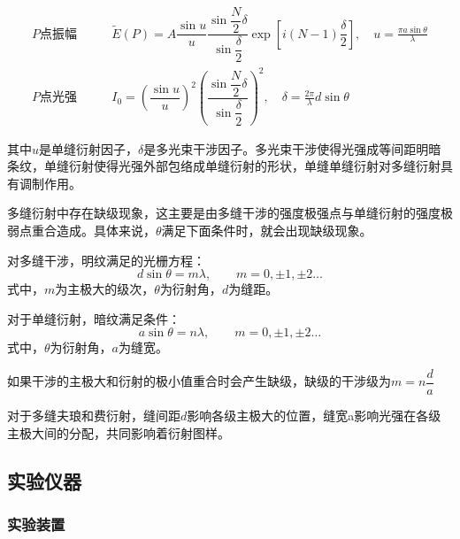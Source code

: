 \documentclass[a4paper]{../phyreport}
\begin{document}
\begin{align}
  P \text{点振幅} & \qquad \tilde{E}(P) = A\dfrac{\sin u}{u}\dfrac{\sin\dfrac{N}{2}\delta}{\sin\dfrac{\delta}{2}}\exp\left[i(N-1)\dfrac{\delta}{2}\right], \quad u=\frac{\pi a \sin \theta}{\lambda} \\
  P \text{点光强} & \qquad I_0 = \left(\dfrac{\sin u}{u}\right)^2\left(\dfrac{\sin\dfrac{N}{2}\delta}{\sin\dfrac{\delta}{2}}\right)^2, \quad \delta = \frac{2 \pi}{\lambda} d \sin \theta
\end{align}

其中$u$是单缝衍射因子，$\delta$是多光束干涉因子。多光束干涉使得光强成等间距明暗条纹，单缝衍射使得光强外部包络成单缝衍射的形状，单缝单缝衍射对多缝衍射具有调制作用。

多缝衍射中存在缺级现象，这主要是由多缝干涉的强度极强点与单缝衍射的强度极弱点重合造成。具体来说，$\theta$满足下面条件时，就会出现缺级现象。

对多缝干涉，明纹满足的光栅方程：
\begin{equation}
  d \sin \theta = m \lambda, \qquad m=0, \pm 1, \pm 2\dots
\end{equation}
式中，$m$为主极大的级次，$\theta$为衍射角，$d$为缝距。

对于单缝衍射，暗纹满足条件：
\begin{equation}
  a \sin \theta = n \lambda, \qquad  m=0, \pm 1, \pm 2\dots
\end{equation}
式中，$\theta$为衍射角，$a$为缝宽。

如果干涉的主极大和衍射的极小值重合时会产生缺级，缺级的干涉级为$m=n\dfrac{d}{a}$

对于多缝夫琅和费衍射，缝间距$d$影响各级主极大的位置，缝宽a影响光强在各级主极大间的分配，共同影响着衍射图样。

\subsection{实验仪器}

\subsubsection{实验装置}
\end{document}
